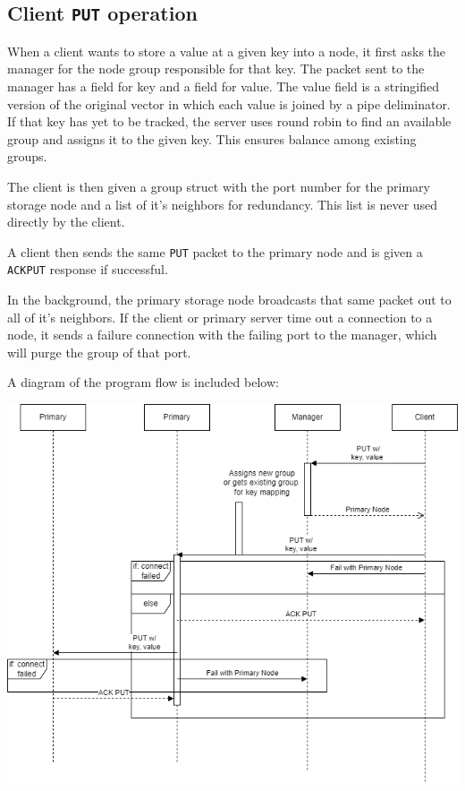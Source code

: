 \documentclass{article}
\begin{document}
\subsection{Client \texttt{PUT} operation}
When a client wants to store a value at a given key into a node, it first asks the manager for the node group responsible for that key.
The packet sent to the manager has a field for key and a field for value.
The value field is a stringified version of the original vector in which each value is joined by a pipe deliminator.
If that key has yet to be tracked, the server uses round robin to find an available group and assigns it to the given key. This ensures balance among
existing groups.

The client is then given a group struct with the port number for the primary storage node and a list of it's neighbors for redundancy. 
This list is never used directly by the client.

A client then sends the same \texttt{PUT} packet to the primary node and is given a \texttt{ACKPUT} response if successful.

In the background, the primary storage node broadcasts that same packet out to all of it's neighbors. If the client or primary server time out a connection
to a node, it sends a failure connection with the failing port to the manager, which will purge the group of that port. 

A diagram of the program flow is included below:\\
\begin{center}
    \includegraphics[scale=0.7]{img/Put.drawio.png}
\end{center}
\end{document}

